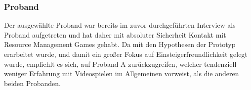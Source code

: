\subsubsection{Proband}
Der ausgewählte Proband war bereits im zuvor durchgeführten Interview als Proband aufgetreten und hat daher mit absoluter Sicherheit Kontakt mit Resource Management Games gehabt. Da mit den Hypothesen der Prototyp erarbeitet wurde, und damit ein großer Fokus auf Einsteigerfreundlichkeit gelegt wurde, empfiehlt es sich, auf Proband A zurückzugreifen, welcher tendenziell weniger Erfahrung mit Videospielen im Allgemeinen vorweist, als die anderen beiden Probanden.

